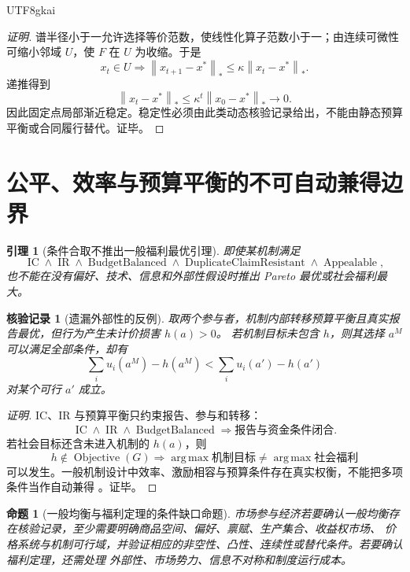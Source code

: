 \documentclass[12pt,a4paper,openany]{report}
\newtheorem{lemma}{引理}[chapter]
\newtheorem{proposition}{命题}[chapter]
\newtheorem{Certificate}{核验记录}[chapter]
\newcommand{\Norm}[1]{\left\lVert #1\right\rVert}
\DeclareMathOperator*{\argmax}{arg\,max}
\DeclareMathOperator{\Appealable}{Appealable}
\DeclareMathOperator{\BudgetBalanced}{BudgetBalanced}
\DeclareMathOperator{\IC}{IC}
\DeclareMathOperator{\IR}{IR}
\DeclareMathOperator{\DuplicateClaimResistant}{DuplicateClaimResistant}
\begin{document}
\begin{CJK*}{UTF8}{gkai}
\begin{proof}[证明]
谱半径小于一允许选择等价范数，使线性化算子范数小于一；由连续可微性可缩小邻域 \(U\)，使
\(F\) 在 \(U\) 为收缩。于是
\[
  x_t\in U
  \Longrightarrow
  \Norm{x_{t+1}-x^*}_*
  \le
  \kappa\Norm{x_t-x^*}_*.
\]
递推得到
\[
  \Norm{x_t-x^*}_*
  \le
  \kappa^t\Norm{x_0-x^*}_*\to0.
\]
因此固定点局部渐近稳定。稳定性必须由此类动态核验记录给出，不能由静态预算平衡或合同履行替代。证毕。
\end{proof}

\section{公平、效率与预算平衡的不可自动兼得边界}

\begin{lemma}[条件合取不推出一般福利最优引理]
\label{lem:gates-not-welfare-optimality}
即使某机制满足
\[
  \IC\wedge\IR\wedge\BudgetBalanced
  \wedge\DuplicateClaimResistant\wedge\Appealable,
\]
也不能在没有偏好、技术、信息和外部性假设时推出 Pareto 最优或社会福利最大。
\end{lemma}

\begin{Certificate}[遗漏外部性的反例]
取两个参与者，机制内部转移预算平衡且真实报告最优，但行为产生未计价损害 \(h(a)>0\)。
若机制目标未包含 \(h\)，则其选择 \(a^M\) 可以满足全部条件，却有
\[
  \sum_i u_i(a^M)-h(a^M)
  <
  \sum_i u_i(a')-h(a')
\]
对某个可行 \(a'\) 成立。
\end{Certificate}

\begin{proof}[证明]
IC、IR 与预算平衡只约束报告、参与和转移：
\[
  \IC\wedge\IR\wedge\BudgetBalanced
  \Longrightarrow
  \text{报告与资金条件闭合}.
\]
若社会目标还含未进入机制的 \(h(a)\)，则
\[
  h\notin\operatorname{Objective}(G)
  \Longrightarrow
  \argmax \text{机制目标}
  \ne
  \argmax \text{社会福利}
\]
可以发生。一般机制设计中效率、激励相容与预算条件存在真实权衡，不能把多项条件当作自动兼得
\cite{GreenLaffont1979Incentives}。证毕。
\end{proof}

\begin{proposition}[一般均衡与福利定理的条件缺口命题]
\label{prop:general-equilibrium-gap}
市场参与经济若要确认一般均衡存在核验记录，至少需要明确商品空间、偏好、禀赋、生产集合、收益权市场、
价格系统与机制可行域，并验证相应的非空性、凸性、连续性或替代条件。若要确认福利定理，还需处理
外部性、市场势力、信息不对称和制度运行成本。
\end{proposition}


\end{CJK*}
\end{document}
